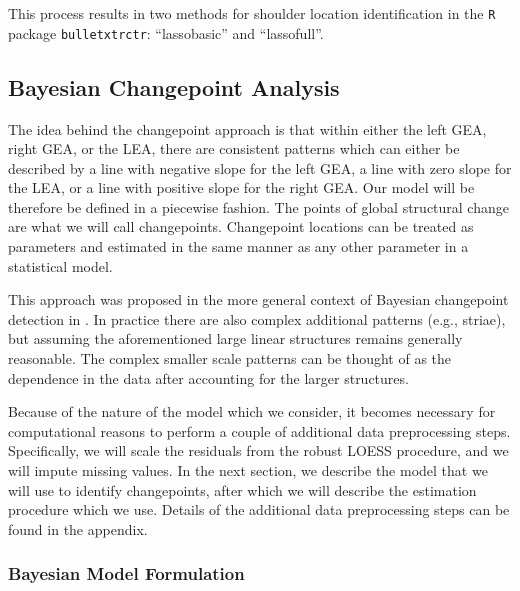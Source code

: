 \documentclass[12pt]{article}
\begin{document}
This process results in two methods for shoulder location identification
in the \texttt{R} package \texttt{bulletxtrctr}: ``lassobasic'' and
``lassofull''.

\subsection{Bayesian Changepoint Analysis}

The idea behind the changepoint approach is that within either the left
GEA, right GEA, or the LEA, there are consistent patterns which can
either be described by a line with negative slope for the left GEA, a
line with zero slope for the LEA, or a line with positive slope for the
right GEA. Our model will be therefore be defined in a piecewise
fashion. The points of global structural change are what we will call
changepoints. Changepoint locations can be treated as parameters and
estimated in the same manner as any other parameter in a statistical
model.

This approach was proposed in the more general context of Bayesian
changepoint detection in \citet{stephens1994}. In practice there are
also complex additional patterns (e.g., striae), but assuming the
aforementioned large linear structures remains generally reasonable. The
complex smaller scale patterns can be thought of as the dependence in
the data after accounting for the larger structures.

Because of the nature of the model which we consider, it becomes
necessary for computational reasons to perform a couple of additional
data preprocessing steps. Specifically, we will scale the residuals from
the robust LOESS procedure, and we will impute missing values. In the
next section, we describe the model that we will use to identify
changepoints, after which we will describe the estimation procedure
which we use. Details of the additional data preprocessing steps can be
found in the appendix.

\subsubsection{Bayesian Model Formulation}
\end{document}
